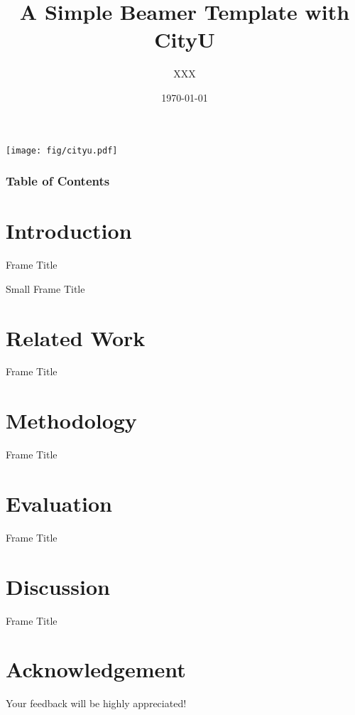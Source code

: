\documentclass{beamer}
\title[]
{A Simple Beamer Template with CityU }
\author[XXX]{XXX}
\institute[XXX]
{
  City University of Macau
}
\date[\today]{\today}
\begin{document}
\begin{frame}[plain]
    \centering
    \texttt{[image: fig/cityu.pdf]}
    \vspace{-5mm}
    \titlepage
\end{frame}

\begin{frame}[plain]
\frametitle{Table of Contents}
\hfill
\parbox[t]{.95\textwidth}{
  \begin{minipage}[t][0.8\textheight]{0.95\textwidth}
\tableofcontents[sectionstyle=show,subsectionstyle=show/shaded/hide,subsubsectionstyle=show/shaded/hide]
  \end{minipage}
}
\end{frame}

\section{Introduction}

\begin{frame}{Frame Title}
\end{frame}


{   
\begin{frame}{Small Frame Title}
\end{frame}
}


\section{Related Work}

\begin{frame}{Frame Title}
    
\end{frame}

\section{Methodology}

\begin{frame}{Frame Title}

\end{frame}


\section{Evaluation}
\begin{frame}{Frame Title}   
\end{frame}

\section{Discussion}
\begin{frame}{Frame Title}
    
\end{frame}

\section{Acknowledgement}  
\begin{frame}
\textcolor{cityugreen}{\large{\centerline{ Your feedback will be highly appreciated!}}}
\end{frame}
\end{document}
